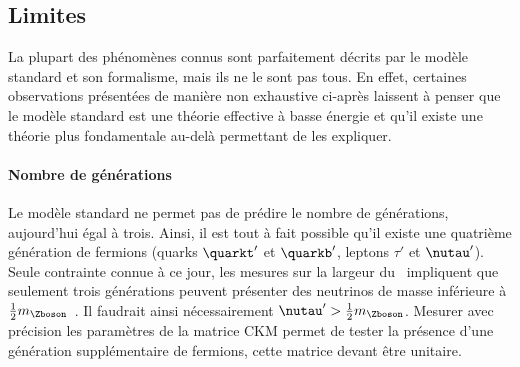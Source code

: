 \subsection{Limites}\label{chapter-MS-MSSM-section-succes_limites-subsec-limites}
La plupart des phénomènes connus sont parfaitement décrits par le modèle standard et son formalisme, mais ils ne le sont pas tous.
En effet, certaines observations présentées de manière non exhaustive ci-après laissent à penser que le modèle standard est une théorie effective à basse énergie et qu'il existe une théorie plus fondamentale au-delà permettant de les expliquer.
\paragraph{Nombre de générations}
Le modèle standard ne permet pas de prédire le nombre de générations, aujourd'hui égal à trois.
Ainsi, il est tout à fait possible qu'il existe une quatrième génération de fermions (quarks $\quarkt'$ et $\quarkb'$, leptons $\tau'$ et $\nutau'$).
Seule contrainte connue à ce jour, les mesures sur la largeur du \Zboson\ impliquent que seulement trois générations peuvent présenter des neutrinos de masse inférieure à $\frac{1}{2} m_{\Zboson}$~\cite{light_neutrino_number}.
Il faudrait ainsi nécessairement $\nutau' > \frac{1}{2} m_{\Zboson}$.
Mesurer avec précision les paramètres de la matrice CKM permet de tester la présence d'une génération supplémentaire de fermions, cette matrice devant être unitaire.

